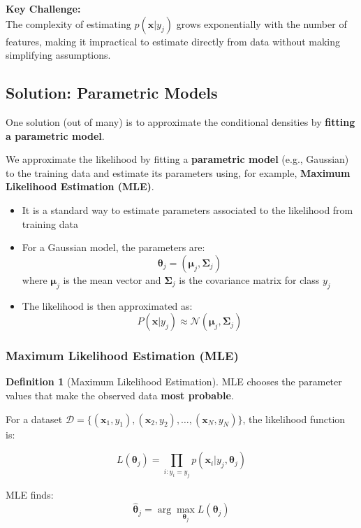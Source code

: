 \documentclass[11pt,a4paper]{article}
\theoremstyle{definition}
\newtheorem{definition}{Definition}[section]
\theoremstyle{plain}
\theoremstyle{remark}
\begin{document}
\begin{center}
\colorbox{yellow!20}{\parbox{0.9\textwidth}{
\textbf{Key Challenge:}\\[0.2cm]
The complexity of estimating $p(\mathbf{x}|y_j)$ grows exponentially with the number of features, making it impractical to estimate directly from data without making simplifying assumptions.
}}
\end{center}

\subsection{Solution: Parametric Models}

One solution (out of many) is to approximate the conditional densities by \textbf{fitting a parametric model}.

\begin{tcolorbox}[colback=green!5!white,colframe=green!75!black,title=\textbf{Parametric Approach}]
We approximate the likelihood by fitting a \textbf{parametric model} (e.g., Gaussian) to the training data and estimate its parameters using, for example, \textbf{Maximum Likelihood Estimation (MLE)}.

\begin{itemize}
    \item It is a standard way to estimate parameters associated to the likelihood from training data
    
    \item For a Gaussian model, the parameters are:
    \[
    \boldsymbol{\theta}_j = (\boldsymbol{\mu}_j, \boldsymbol{\Sigma}_j)
    \]
    where $\boldsymbol{\mu}_j$ is the mean vector and $\boldsymbol{\Sigma}_j$ is the covariance matrix for class $y_j$
    
    \item The likelihood is then approximated as:
    \[
    P(\mathbf{x} | y_j) \approx \mathcal{N}(\boldsymbol{\mu}_j, \boldsymbol{\Sigma}_j)
    \]
\end{itemize}
\end{tcolorbox}

\subsubsection{Maximum Likelihood Estimation (MLE)}

\begin{definition}[Maximum Likelihood Estimation]
MLE chooses the parameter values that make the observed data \textbf{most probable}.

For a dataset $\mathcal{D} = \{(\mathbf{x}_1, y_1), (\mathbf{x}_2, y_2), \ldots, (\mathbf{x}_N, y_N)\}$, the likelihood function is:

\[
L(\boldsymbol{\theta}_j) = \prod_{i: y_i = y_j} p(\mathbf{x}_i | y_j, \boldsymbol{\theta}_j)
\]

MLE finds:
\[
\hat{\boldsymbol{\theta}}_j = \arg\max_{\boldsymbol{\theta}_j} L(\boldsymbol{\theta}_j)
\]
\end{definition}
\end{document}
